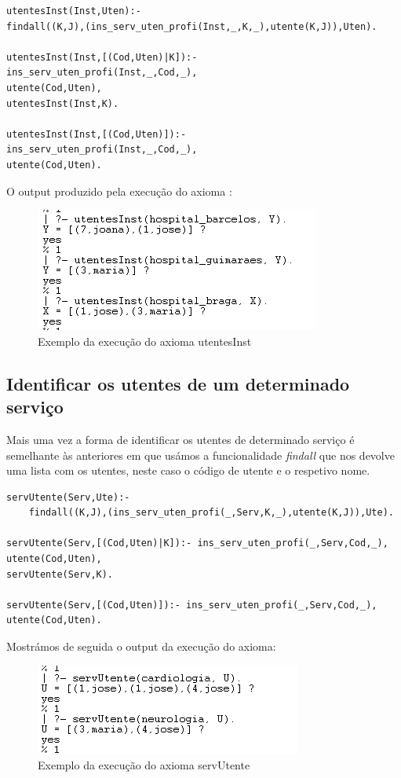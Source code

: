 \begin{verbatim}
utentesInst(Inst,Uten):-
findall((K,J),(ins_serv_uten_profi(Inst,_,K,_),utente(K,J)),Uten).      

utentesInst(Inst,[(Cod,Uten)|K]):- 
ins_serv_uten_profi(Inst,_,Cod,_),
utente(Cod,Uten),
utentesInst(Inst,K).

utentesInst(Inst,[(Cod,Uten)]):-
ins_serv_uten_profi(Inst,_,Cod,_),
utente(Cod,Uten).
\end{verbatim}

O output produzido pela execução do axioma :
\begin{figure}[<+htpb+>]
	\centering
	\includegraphics[scale=0.9]{answer2.png}
	\caption{Exemplo da execução do axioma utentesInst}
	\label{p3:fig:output2}
\end{figure}


\subsection{Identificar os utentes de um determinado serviço}
Mais uma vez a forma de identificar os utentes de determinado serviço é semelhante às anteriores em que usámos a funcionalidade \textit{findall} que nos devolve uma lista com os utentes, neste caso o código de utente e o respetivo nome. 

\begin{verbatim}
servUtente(Serv,Ute):-
	findall((K,J),(ins_serv_uten_profi(_,Serv,K,_),utente(K,J)),Ute).

servUtente(Serv,[(Cod,Uten)|K]):- ins_serv_uten_profi(_,Serv,Cod,_),
utente(Cod,Uten), 
servUtente(Serv,K).

servUtente(Serv,[(Cod,Uten)]):- ins_serv_uten_profi(_,Serv,Cod,_),
utente(Cod,Uten).
\end{verbatim}

Mostrámos de seguida o output da execução do axioma: 

\begin{figure}[<+htpb+>]
	\centering
	\includegraphics[scale=0.9]{answer3.png}
	\caption{Exemplo da execução do axioma servUtente}
	\label{p3:fig:output3}
\end{figure}

